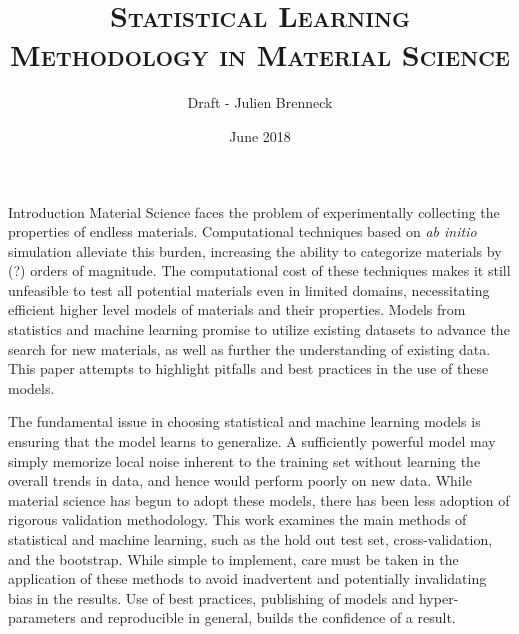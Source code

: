 \documentclass[onecolumn,abstract,letter]{scrartcl}
\title{\textsc{\textmd{Statistical Learning Methodology in Material Science}}}
\author{Draft - Julien Brenneck}
\date{June 2018}
\begin{document}
\maketitle







\begin{section}{Introduction}
Material Science faces the problem of experimentally collecting the properties of endless materials. 
Computational techniques based on \textit{ab initio} simulation alleviate this burden, increasing the ability to categorize materials by (?) orders of magnitude. 
The computational cost of these techniques makes it still unfeasible to test all potential materials even in limited domains, necessitating efficient higher level models of materials and their properties. 
Models from statistics and machine learning promise to utilize existing datasets to advance the search for new materials, as well as further the understanding of existing data.
This paper attempts to highlight pitfalls and best practices in the use of these models. 

The fundamental issue in choosing statistical and machine learning models is ensuring that the model learns to generalize.
A sufficiently powerful model may simply memorize local noise inherent to the training set without learning the overall trends in data, and hence would perform poorly on new data. 
While material science has begun to adopt these models, there has been less adoption of rigorous validation methodology.
This work examines the main methods of statistical and machine learning, such as the hold out test set, cross-validation, and the bootstrap. 
While simple to implement, care must be taken in the application of these methods to avoid inadvertent and potentially invalidating bias in the results. 
Use of best practices, publishing of models and hyper-parameters and reproducible in general, builds the confidence of a result. 

\end{section}
\end{document}
